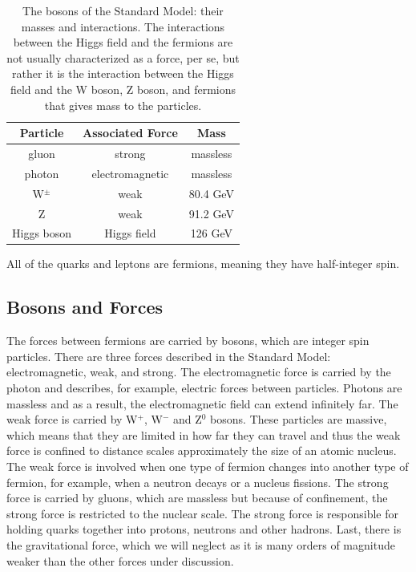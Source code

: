 \begin{table}
	\caption{The bosons of the Standard Model: their masses and interactions.   
    The interactions between the Higgs field and the fermions are not usually characterized as 
    a force, per se, but rather it is the interaction between the 
    Higgs field and the W boson, Z boson, and fermions that gives mass to the particles.  \label{tab:boson_table}}
    \center
	\begin{tabular}{| c || c | c |}
	\hline
	Particle & Associated Force & Mass \\
	\hline
	gluon & strong & massless \\
	photon & electromagnetic & massless \\
	W$^\pm$ & weak & 80.4 GeV \\
	Z & weak & 91.2 GeV \\ 
	Higgs boson & Higgs field & 126 GeV \\
	\hline
	\end{tabular}
\end{table}


All of the quarks and leptons are fermions, meaning they have half-integer spin.

\subsection{Bosons and Forces}

The forces between fermions are carried by bosons, which are integer spin particles.  
There are three forces described in the Standard Model: electromagnetic, weak, and 
strong.  The electromagnetic force is carried by the photon and describes, for example, 
electric forces between particles.  Photons are massless and as a result, the electromagnetic 
field can extend infinitely far.  The weak force is carried by W$^+$, 
W$^-$ and Z$^0$ bosons.  These particles are massive, which 
means that they are limited in how far they can travel and thus the weak 
force is confined to distance scales approximately the size of an atomic nucleus.  The 
weak force is involved when one type of fermion changes into another type of fermion, 
for example, when a neutron decays or a nucleus fissions.  The strong force 
is carried by gluons, which are massless but because of confinement, the strong 
force is restricted to the nuclear scale.  The strong force is responsible for holding 
quarks together into protons, neutrons and other hadrons. Last, there is the 
gravitational force, which we will neglect as it is many orders of magnitude weaker 
than the other forces under discussion.

